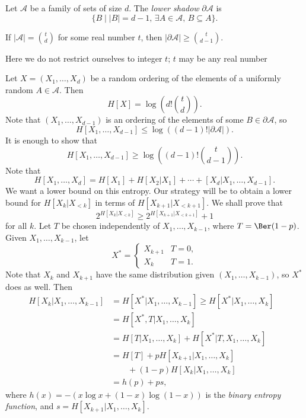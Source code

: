 \documentclass[12pt]{article}
\begin{document}
\begin{definition}
	Let $\mathcal{A}$ be a family of sets of size $d$. The \emph{lower shadow} $\partial \mathcal{A}$ is
	\[
		\{B \mid |B| = d-1, \, \exists A \in \mathcal{A}, \, B \subseteq A\}.
	\]
\end{definition}

\begin{theorem}
	If $|\mathcal{A}| = \binom t d$ for some real number $t$, then $|\partial \mathcal{A}| \geq \binom t{d-1}$.
\end{theorem}

Here we do not restrict ourselves to integer $t$; $t$ may be any real number

\begin{proofbox}
	Let $X = (X_1, \ldots, X_d)$ be a random ordering of the elements of a uniformly random $A \in \mathcal{A}$. Then
	\[
		H[X] = \log \left( d! \binom t d \right).
	\]
	Note that $(X_1, \ldots, X_{d-1})$ is an ordering of the elements of some $B \in \partial \mathcal{A}$, so
	\[
		H[X_1, \ldots, X_{d-1}] \leq \log \left( (d-1)! |\partial \mathcal{A}| \right).
	\]
	It is enough to show that
	\[
		H[X_1, \ldots, X_{d-1}] \geq \log \left( (d-1)! \binom t{d-1} \right).
	\]
	Note that
	\[
		H[X_1, \ldots, X_{d}] = H[X_1] + H[X_2|X_1] + \cdots + [X_d | X_{1}, \ldots, X_{d-1}].
	\]
	We want a lower bound on this entropy. Our strategy will be to obtain a lower bound for $H[X_k | X_{<k}]$ in terms of $H[X_{k+1} | X_{<k+1}]$. We shall prove that
	\[
		2^{H[X_k|X_{<k}]} \geq 2^{H[X_{k+1}|X_{<k+1}]} + 1
	\]
	for all $k$. Let $T$ be chosen independently of $X_1, \ldots, X_{k-1}$, where $T = \Ber(1-p)$. Given $X_1, \ldots, X_{k-1}$, let
	\[
	X^{\ast} =
	\begin{cases}
		X_{k+1} & T = 0, \\
		X_k & T = 1.
	\end{cases}
	\]
	Note that $X_k$ and $X_{k+1}$ have the same distribution given $(X_1, \ldots, X_{k-1})$, so $X^{\ast}$ does as well. Then
	\begin{align*}
		H[X_k|X_1, \ldots, X_{k-1}] &= H[X^{\ast}|X_1, \ldots, X_{k-1}] \geq H[X^{\ast} | X_1, \ldots, X_k] \\
					    &= H[X^{\ast}, T | X_1, \ldots, X_k] & \\
					    &= H[T | X_1, \ldots, X_k] + H[X^{\ast} | T, X_1, \ldots, X_k] \\
					    &= H[T] + p H[X_{k+1}|X_1,\ldots,X_k] \\
					    &\qquad + (1-p) H[X_k|X_1,\ldots,X_k] \\
					    &= h(p) + ps,
	\end{align*}
	where $h(x) = -(x \log x + (1-x) \log(1-x))$ is the \emph{binary entropy function}, and $s = H[X_{k+1}|X_1,\ldots,X_k]$.


\end{proofbox}
\end{document}
